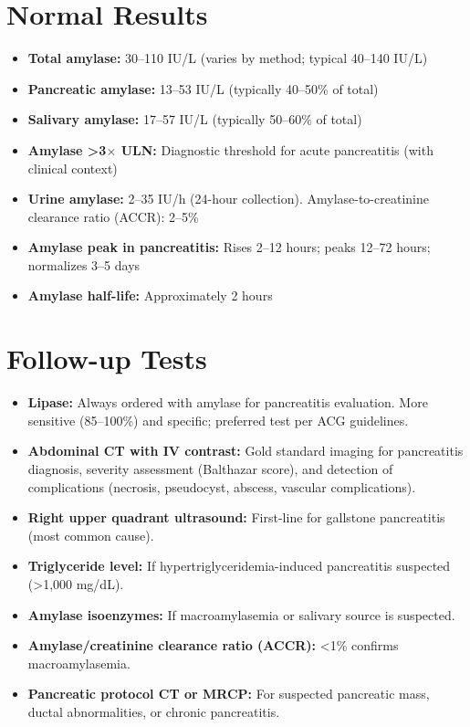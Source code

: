 \section*{Normal Results}
\begin{itemize}
  \item \textbf{Total amylase:} 30--110 IU/L (varies by method; typical 40--140 IU/L)
  \item \textbf{Pancreatic amylase:} 13--53 IU/L (typically 40--50\% of total)
  \item \textbf{Salivary amylase:} 17--57 IU/L (typically 50--60\% of total)
  \item \textbf{Amylase >3$\times$ ULN:} Diagnostic threshold for acute pancreatitis (with clinical context)
  \item \textbf{Urine amylase:} 2--35 IU/h (24-hour collection). Amylase-to-creatinine clearance ratio (ACCR): 2--5\%
  \item \textbf{Amylase peak in pancreatitis:} Rises 2--12 hours; peaks 12--72 hours; normalizes 3--5 days
  \item \textbf{Amylase half-life:} Approximately 2 hours
\end{itemize}

\section*{Follow-up Tests}
\begin{itemize}
  \item \textbf{Lipase:} Always ordered with amylase for pancreatitis evaluation. More sensitive (85--100\%) and specific; preferred test per ACG guidelines.
  \item \textbf{Abdominal CT with IV contrast:} Gold standard imaging for pancreatitis diagnosis, severity assessment (Balthazar score), and detection of complications (necrosis, pseudocyst, abscess, vascular complications).
  \item \textbf{Right upper quadrant ultrasound:} First-line for gallstone pancreatitis (most common cause).
  \item \textbf{Triglyceride level:} If hypertriglyceridemia-induced pancreatitis suspected (>1,000 mg/dL).
  \item \textbf{Amylase isoenzymes:} If macroamylasemia or salivary source is suspected.
  \item \textbf{Amylase/creatinine clearance ratio (ACCR):} <1\% confirms macroamylasemia.
  \item \textbf{Pancreatic protocol CT or MRCP:} For suspected pancreatic mass, ductal abnormalities, or chronic pancreatitis.
\end{itemize}

